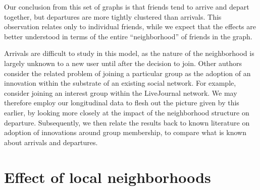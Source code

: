 \documentclass[phd,tocprelim]{cornell}
\begin{document}
Our conclusion from this set of graphs is that friends tend to arrive
and depart together, but departures are more tightly clustered than
arrivals.  This observation relates only to individual friends, while
we expect that the effects are better understood in terms of the
entire ``neighborhood'' of friends in the graph.

Arrivals are difficult to study in this model, as the nature of the
neighborhood is largely unknown to a new user until after the decision
to join.  Other authors consider the related problem of joining a
particular group as the adoption of an innovation within the substrate
of an existing social network.  For example, \cite{Backstrom:2006}
consider joining an interest group within the LiveJournal network.  We
may therefore employ our longitudinal data to flesh out the picture
given by this earlier, by looking more closely at the impact of the
neighborhood structure on departure.  Subsequently, we then relate the
results back to known literature on adoption of innovations around
group membership, to compare what is known about arrivals and
departures.

\section{Effect of local neighborhoods}
\end{document}
